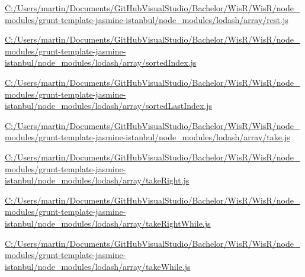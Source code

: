 \begin{DoxyCompactItemize}
\item 
\hyperlink{_c_1_2_users_2martin_2_documents_2_git_hub_visual_studio_2_bachelor_2_wis_r_2_wis_r_2node_module665242255d5b4c022445f1e15747dec4}{C\+:/\+Users/martin/\+Documents/\+Git\+Hub\+Visual\+Studio/\+Bachelor/\+Wis\+R/\+Wis\+R/node\+\_\+modules/grunt-\/template-\/jasmine-\/istanbul/node\+\_\+modules/lodash/array/rest.\+js}
\item 
\hyperlink{_c_1_2_users_2martin_2_documents_2_git_hub_visual_studio_2_bachelor_2_wis_r_2_wis_r_2node_module6b893fce4ef2730ca2766808678960da}{C\+:/\+Users/martin/\+Documents/\+Git\+Hub\+Visual\+Studio/\+Bachelor/\+Wis\+R/\+Wis\+R/node\+\_\+modules/grunt-\/template-\/jasmine-\/istanbul/node\+\_\+modules/lodash/array/sorted\+Index.\+js}
\item 
\hyperlink{_c_1_2_users_2martin_2_documents_2_git_hub_visual_studio_2_bachelor_2_wis_r_2_wis_r_2node_module64e8cf3721e3f1a5a3cf7cae4511b787}{C\+:/\+Users/martin/\+Documents/\+Git\+Hub\+Visual\+Studio/\+Bachelor/\+Wis\+R/\+Wis\+R/node\+\_\+modules/grunt-\/template-\/jasmine-\/istanbul/node\+\_\+modules/lodash/array/sorted\+Last\+Index.\+js}
\item 
\hyperlink{_c_1_2_users_2martin_2_documents_2_git_hub_visual_studio_2_bachelor_2_wis_r_2_wis_r_2node_modulebe43734bea91ede1ee0541359ad37711}{C\+:/\+Users/martin/\+Documents/\+Git\+Hub\+Visual\+Studio/\+Bachelor/\+Wis\+R/\+Wis\+R/node\+\_\+modules/grunt-\/template-\/jasmine-\/istanbul/node\+\_\+modules/lodash/array/take.\+js}
\item 
\hyperlink{_c_1_2_users_2martin_2_documents_2_git_hub_visual_studio_2_bachelor_2_wis_r_2_wis_r_2node_module227f301c932f3412e1933931142dc2bf}{C\+:/\+Users/martin/\+Documents/\+Git\+Hub\+Visual\+Studio/\+Bachelor/\+Wis\+R/\+Wis\+R/node\+\_\+modules/grunt-\/template-\/jasmine-\/istanbul/node\+\_\+modules/lodash/array/take\+Right.\+js}
\item 
\hyperlink{_c_1_2_users_2martin_2_documents_2_git_hub_visual_studio_2_bachelor_2_wis_r_2_wis_r_2node_module2c9e97ec607ba8db5a53f108380d1d9f}{C\+:/\+Users/martin/\+Documents/\+Git\+Hub\+Visual\+Studio/\+Bachelor/\+Wis\+R/\+Wis\+R/node\+\_\+modules/grunt-\/template-\/jasmine-\/istanbul/node\+\_\+modules/lodash/array/take\+Right\+While.\+js}
\item 
\hyperlink{_c_1_2_users_2martin_2_documents_2_git_hub_visual_studio_2_bachelor_2_wis_r_2_wis_r_2node_modulefcda543557406226c9c41a26d0ec7d8c}{C\+:/\+Users/martin/\+Documents/\+Git\+Hub\+Visual\+Studio/\+Bachelor/\+Wis\+R/\+Wis\+R/node\+\_\+modules/grunt-\/template-\/jasmine-\/istanbul/node\+\_\+modules/lodash/array/take\+While.\+js}

\end{DoxyCompactItemize}
